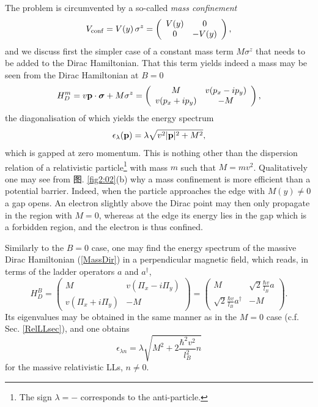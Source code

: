 \documentclass[10pt]{book}
\newcommand{\sigmab}{\mbox{\boldmath $\sigma $}}
\newcommand{\bp}{{\bf p}}
\newcommand{\beq}{\begin{equation}}
\newcommand{\eeq}{\end{equation}}
\begin{document}
The problem is circumvented by a so-called {\sl mass confinement}
\beq\label{MassConfA}
V_{\rm conf}=V(y)\,\sigma^z=\left(\begin{array}{cc} V(y) & 0 \\ 0 & -V(y) \end{array}\right),
\eeq
and we discuss first the simpler case of a constant mass term $M\sigma^z$ that needs to be added to the Dirac 
Hamiltonian. That this term yields indeed a mass may be seen from the Dirac Hamiltonian at $B=0$ 
\beq\label{MassDir}
H_D^m=v\bp\cdot\sigmab + M\sigma^z=\left(
\begin{array}{cc}
 M & v(p_x - ip_y) \\ v(p_x + ip_y) & -M
\end{array}\right),
\eeq 
the diagonalisation of which yields the energy spectrum
$$\epsilon_{\lambda}(\bp)= \lambda\sqrt{v^2|\bp|^2 + M^2},$$
which is gapped at zero momentum. This is nothing other than the dispersion relation of a relativistic particle\footnote{
The sign $\lambda=-$ corresponds to the anti-particle.}
with mass $m$ such that $M=mv^2$. Qualitatively one may see from 图. \ref{fig2:02}(b) why a mass confinement is 
more efficient than a potential barrier. Indeed, when the particle approaches the edge with $M(y)\neq 0$ a gap opens. 
An electron slightly above the Dirac point may then only propagate in the region with $M=0$, whereas at the edge its
energy lies in the gap which is a forbidden region, and the electron is thus confined. 

Similarly to the $B=0$ case, one may find the energy spectrum of the massive Dirac Hamiltonian (\ref{MassDir}) in 
a perpendicular magnetic field, which reads, in terms of the ladder operators $a$ and $a^{\dagger}$,
\beq\label{MassDirB}
H_D^B=  \left(\begin{array}{cc}
M & v(\Pi_x- i \Pi_y) \\ v(\Pi_x+ i \Pi_y) & -M
        \end{array}\right) = \left(\begin{array}{cc}
M & \sqrt{2}\frac{\hbar v}{l_B} a \\ \sqrt{2}\frac{\hbar v}{l_B} a^{\dagger} & -M
        \end{array}\right) .
\eeq
Its eigenvalues may be obtained in the same manner as in the $M=0$ case (c.f. Sec. \ref{RelLLsec}), and one obtains
\beq\label{MassiveLL}
\epsilon_{\lambda n} = \lambda \sqrt{M^2 + 2\frac{\hbar^2 v^2}{l_B^2} n} 
\eeq
for the massive relativistic LLs, $n\neq 0$. 
\end{document}
